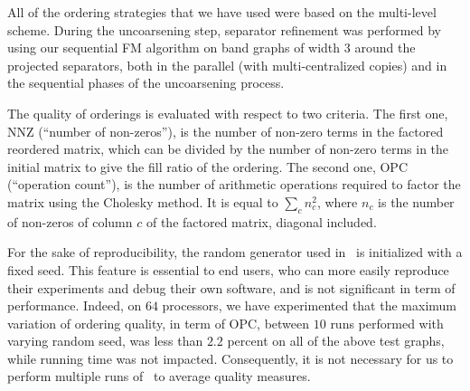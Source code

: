 \documentclass[fleqn,12pt,twoside]{article}
\begin{document}
All of the ordering strategies that we have used were based on the
multi-level scheme. During the uncoarsening step, separator refinement
was performed by using our sequential FM algorithm on band graphs of
width $3$ around the projected separators, both in the parallel
(with multi-centralized copies) and in the sequential phases of the
uncoarsening process.

The quality of orderings is evaluated with respect to two
criteria. The first one, NNZ (``number of non-zeros''), is the number
of non-zero terms in the factored reordered matrix, which can be
divided by the number of non-zero terms in the initial matrix to give
the fill ratio of the ordering. The second one, OPC (``operation
count''), is the number of arithmetic operations required to factor
the matrix using the Cholesky method. It is equal to $\sum_c n_c^2$,
where $n_c$ is the number of non-zeros of column $c$ of the factored
matrix, diagonal included.

For the sake of reproducibility, the random generator used in \scotch\
is initialized with a fixed seed. This feature is essential to end
users, who can more easily reproduce their experiments and debug their
own software, and is not significant in term of performance. Indeed,
on $64$ processors, we have experimented that the maximum variation of
ordering quality, in term of OPC, between $10$ runs performed with
varying random seed, was less than $2.2$ percent on all of the above
test graphs, while running time was not impacted. Consequently,
it is not necessary for us to perform multiple runs of \scotch\ to
average quality measures.
\\
\end{document}
